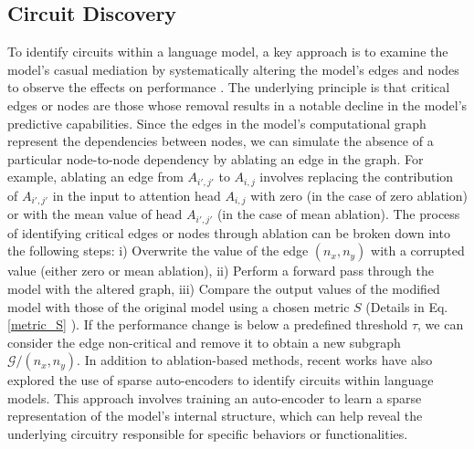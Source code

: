 \subsection{Circuit Discovery}
To identify circuits within a language model, a key approach is to examine the model's casual mediation by systematically altering the model's edges and nodes to observe the effects on performance \cite{acdc,pearl2022direct,vig2020investigating}. 
The underlying principle is that critical edges or nodes are those whose removal results in a notable decline in the model's predictive capabilities.
Since the edges in the model's computational graph represent the dependencies between nodes, we can simulate the absence of a particular node-to-node dependency by ablating an edge in the graph.
For example, ablating an edge from $A_{i',j'}$ to $A_{i,j}$ involves replacing the contribution of $A_{i',j'}$ in the input to attention head $A_{i,j}$ with zero (in the case of zero ablation) or with the mean value of head $A_{i',j'}$ (in the case of mean ablation).
The process of identifying critical edges or nodes through ablation can be broken down into the following steps:
i) Overwrite the value of the edge $(n_{x},n_{y})$ with a corrupted value (either zero or mean ablation),
ii) Perform a forward pass through the model with the altered graph,
iii) Compare the output values of the modified model with those of the original model using a chosen metric $S$ (Details in Eq.\ref{metric_S} ).
If the performance change is below a predefined threshold $\tau$, we can consider the edge non-critical and remove it to obtain a new subgraph $\mathcal{G}/{(n_{x},n_{y})}$.
In addition to ablation-based methods, recent works have also explored the use of sparse auto-encoders \cite{he2024dictionary,cunningham2023sparse} to identify circuits within language models. 
This approach involves training an auto-encoder to learn a sparse representation of the model's internal structure, which can help reveal the underlying circuitry responsible for specific behaviors or functionalities.


